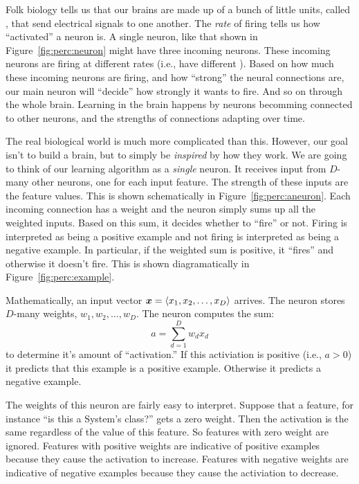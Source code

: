 Folk biology tells us that our brains are made up of a bunch of little
units, called , that send electrical signals to one
another.  The \emph{rate} of firing tells us how ``activated'' a
neuron is.  A single neuron, like that shown in
Figure~\ref{fig:perc:neuron} might have three incoming neurons.  These
incoming neurons are firing at different rates (i.e., have different
).  Based on how much these incoming neurons are
firing, and how ``strong'' the neural connections are, our main neuron
will ``decide'' how strongly it wants to fire.  And so on through the
whole brain.  Learning in the brain happens by neurons becomming
connected to other neurons, and the strengths of connections adapting
over time.


The real biological world is much more complicated than this.
However, our goal isn't to build a brain, but to simply be
\emph{inspired} by how they work.  We are going to think of our
learning algorithm as a \emph{single} neuron.  It receives input from
$D$-many other neurons, one for each input feature.  The strength of
these inputs are the feature values.  This is shown schematically in
Figure~\ref{fig:perc:aneuron}.  Each incoming connection has a weight
and the neuron simply sums up all the weighted inputs.  Based on this
sum, it decides whether to ``fire'' or not.  Firing is interpreted as
being a positive example and not firing is interpreted as being a
negative example.  In particular, if the weighted sum is positive, it
``fires'' and otherwise it doesn't fire.  This is shown
diagramatically in Figure~\ref{fig:perc:example}.

Mathematically, an input vector ${\boldsymbol{x}} = \langle x_1, x_2, \dots, x_D
\rangle$ arrives.  The neuron stores $D$-many weights, $w_1, w_2,
\dots, w_D$.  The neuron computes the sum:
\begin{equation} \label{eq:perc:sum}
a = \sum_{d=1}^D w_d x_d
\end{equation}
to determine it's amount of ``activation.''  If this activiation is
positive (i.e., $a > 0$) it predicts that this example is a positive
example.  Otherwise it predicts a negative example.

The weights of this neuron are fairly easy to interpret.  Suppose that
a feature, for instance ``is this a System's class?'' gets a zero
weight.  Then the activation is the same regardless of the value of
this feature.  So features with zero weight are ignored.  Features
with positive weights are indicative of positive examples because they
cause the activation to increase.  Features with negative weights are
indicative of negative examples because they cause the activiation to
decrease.

